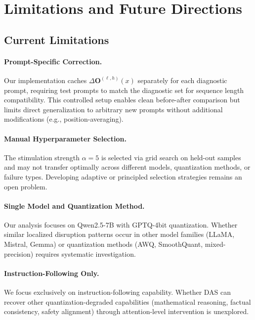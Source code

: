\section{Limitations and Future Directions}
\label{app:limitations}

\subsection{Current Limitations}

\paragraph{Prompt-Specific Correction.}
Our implementation caches $\Delta\mathbf{O}^{(\ell,h)}(x)$ separately for each 
diagnostic prompt, requiring test prompts to match the diagnostic set for 
sequence length compatibility. This controlled setup enables clean before-after 
comparison but limits direct generalization to arbitrary new prompts without 
additional modifications (e.g., position-averaging).

\paragraph{Manual Hyperparameter Selection.}
The stimulation strength $\alpha=5$ is selected via grid search on held-out 
samples and may not transfer optimally across different models, quantization 
methods, or failure types. Developing adaptive or principled selection strategies 
remains an open problem.

\paragraph{Single Model and Quantization Method.}
Our analysis focuses on Qwen2.5-7B with GPTQ-4bit quantization. Whether similar 
localized disruption patterns occur in other model families (LLaMA, Mistral, 
Gemma) or quantization methods (AWQ, SmoothQuant, mixed-precision) requires 
systematic investigation.

\paragraph{Instruction-Following Only.}
We focus exclusively on instruction-following capability. Whether DAS can 
recover other quantization-degraded capabilities (mathematical reasoning, 
factual consistency, safety alignment) through attention-level intervention 
is unexplored.

